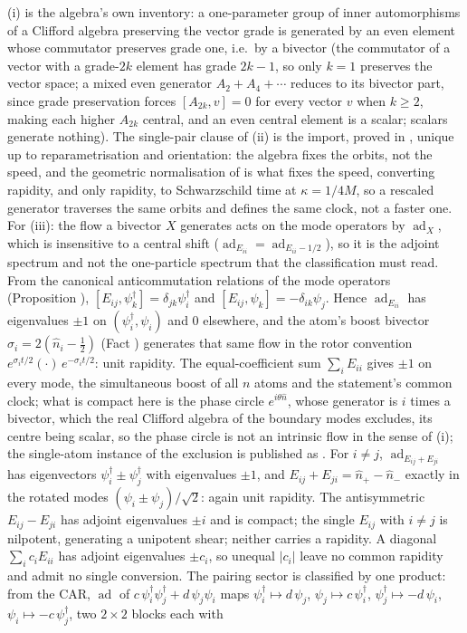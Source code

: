 (i) is the algebra's own inventory: a one-parameter group of inner automorphisms of a Clifford algebra preserving the vector grade is generated by an even element whose commutator preserves grade one, i.e.\ by a bivector (the commutator of a vector with a grade-$2k$ element has grade $2k - 1$, so only $k = 1$ preserves the vector space; a mixed even generator $A_2 + A_4 + \cdots$ reduces to its bivector part, since grade preservation forces $[A_{2k}, v] = 0$ for every vector $v$ when $k \geq 2$, making each higher $A_{2k}$ central, and an even central element is a scalar; scalars generate nothing). The single-pair clause of (ii) is the import, proved in \cite[Prop.~2.1]{ButlerT7}, unique up to reparametrisation and orientation: the algebra fixes the orbits, not the speed, and the geometric normalisation of \cite[App.~A]{ButlerT5} is what fixes the speed, converting rapidity, and only rapidity, to Schwarzschild time at $\kappa = 1/4M$, so a rescaled generator traverses the same orbits and defines the same clock, not a faster one. For (iii): the flow a bivector $X$ generates acts on the mode operators by $\operatorname{ad}_X$, which is insensitive to a central shift ($\operatorname{ad}_{E_{ii}} = \operatorname{ad}_{E_{ii} - 1/2}$), so it is the adjoint spectrum and not the one-particle spectrum that the classification must read. From the canonical anticommutation relations of the mode operators (Proposition ), $[E_{ij}, \psi_k^\dagger] = \delta_{jk}\psi_i^\dagger$ and $[E_{ij}, \psi_k] = -\delta_{ik}\psi_j$. Hence $\operatorname{ad}_{E_{ii}}$ has eigenvalues $\pm 1$ on $(\psi_i^\dagger, \psi_i)$ and $0$ elsewhere, and the atom's boost bivector $\sigma_i = 2(\hat n_i - \tfrac12)$ (Fact ) generates that same flow in the rotor convention $e^{\sigma_i t/2}(\cdot)\,e^{-\sigma_i t/2}$: unit rapidity. The equal-coefficient sum $\sum_i E_{ii}$ gives $\pm 1$ on every mode, the simultaneous boost of all $n$ atoms and the statement's common clock; what is compact here is the phase circle $e^{i\theta \hat n}$, whose generator is $i$ times a bivector, which the real Clifford algebra of the boundary modes excludes, its centre being scalar, so the phase circle is not an intrinsic flow in the sense of (i); the single-atom instance of the exclusion is published as \cite[Prop.~7.21(3)]{ButlerT5}. For $i \neq j$, $\operatorname{ad}_{E_{ij} + E_{ji}}$ has eigenvectors $\psi_i^\dagger \pm \psi_j^\dagger$ with eigenvalues $\pm 1$, and $E_{ij} + E_{ji} = \hat n_+ - \hat n_-$ exactly in the rotated modes $(\psi_i \pm \psi_j)/\sqrt{2}$: again unit rapidity. The antisymmetric $E_{ij} - E_{ji}$ has adjoint eigenvalues $\pm i$ and is compact; the single $E_{ij}$ with $i \neq j$ is nilpotent, generating a unipotent shear; neither carries a rapidity. A diagonal $\sum_i c_i E_{ii}$ has adjoint eigenvalues $\pm c_i$, so unequal $|c_i|$ leave no common rapidity and admit no single conversion. The pairing sector is classified by one product: from the CAR, $\operatorname{ad}$ of $c\,\psi_i^\dagger\psi_j^\dagger + d\,\psi_j\psi_i$ maps $\psi_i^\dagger \mapsto d\,\psi_j$, $\psi_j \mapsto c\,\psi_i^\dagger$, $\psi_j^\dagger \mapsto -d\,\psi_i$, $\psi_i \mapsto -c\,\psi_j^\dagger$, two $2 \times 2$ blocks each with 